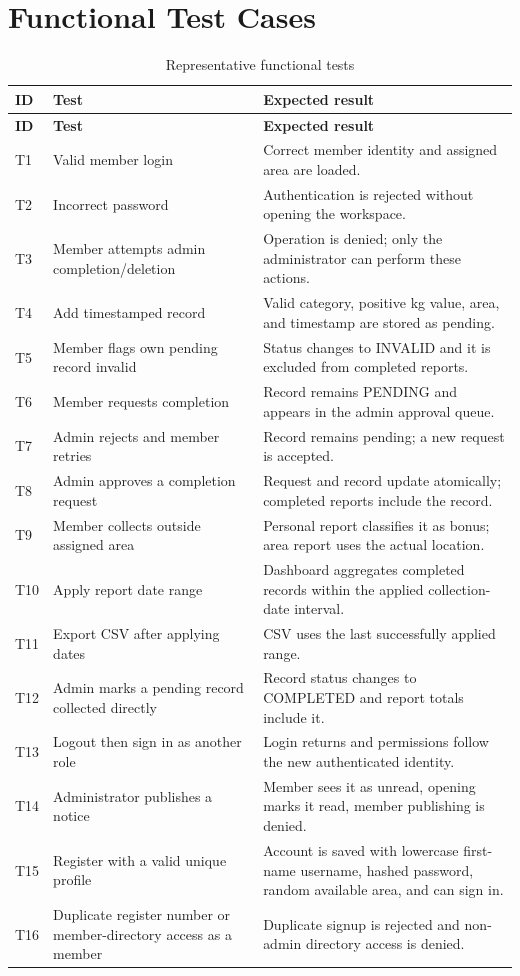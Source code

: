 \documentclass[12pt,a4paper]{report}
\begin{document}
\section{Functional Test Cases}
\begin{longtable}{p{}p{}p{}}
\caption{Representative functional tests}\\
\toprule
\textbf{ID} & \textbf{Test} & \textbf{Expected result}\\
\midrule
\endfirsthead
\toprule
\textbf{ID} & \textbf{Test} & \textbf{Expected result}\\
\midrule
\endhead
T1 & Valid member login & Correct member identity and assigned area are loaded.\\
T2 & Incorrect password & Authentication is rejected without opening the workspace.\\
T3 & Member attempts admin completion/deletion & Operation is denied; only the administrator can perform these actions.\\
T4 & Add timestamped record & Valid category, positive kg value, area, and timestamp are stored as pending.\\
T5 & Member flags own pending record invalid & Status changes to INVALID and it is excluded from completed reports.\\
T6 & Member requests completion & Record remains PENDING and appears in the admin approval queue.\\
T7 & Admin rejects and member retries & Record remains pending; a new request is accepted.\\
T8 & Admin approves a completion request & Request and record update atomically; completed reports include the record.\\
T9 & Member collects outside assigned area & Personal report classifies it as bonus; area report uses the actual location.\\
T10 & Apply report date range & Dashboard aggregates completed records within the applied collection-date interval.\\
T11 & Export CSV after applying dates & CSV uses the last successfully applied range.\\
T12 & Admin marks a pending record collected directly & Record status changes to COMPLETED and report totals include it.\\
T13 & Logout then sign in as another role & Login returns and permissions follow the new authenticated identity.\\
T14 & Administrator publishes a notice & Member sees it as unread, opening marks it read, member publishing is denied.\\
T15 & Register with a valid unique profile & Account is saved with lowercase first-name username, hashed password, random available area, and can sign in.\\
T16 & Duplicate register number or member-directory access as a member & Duplicate signup is rejected and non-admin directory access is denied.\\
\bottomrule
\end{longtable}
\end{document}
